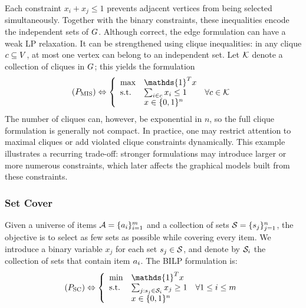 Each constraint $x_i+x_j\leq 1$ prevents adjacent vertices from being selected simultaneously. Together with the binary constraints, these inequalities encode the independent sets of $G$. Although correct, the edge formulation can have a weak LP relaxation. It can be strengthened using clique inequalities: in any clique $c\subseteq V$, at most one vertex can belong to an independent set. Let $\mathcal{K}$ denote a collection of cliques in $G$; this yields the formulation
\begin{align}
    \label{equ:mis_formulation_cliques}
    (P_\mathrm{MIS}) \Leftrightarrow \left\{
    \begin{array}{lll}
        \max        & \mathds{1}^T x   & \\
        \text{s.t.} & \sum_{i\in c} x_i \leq 1 & \forall c \in \CLIQUESET \\
                    & x \in \{0,1\}^n
    \end{array}
    \right.
\end{align}
The number of cliques can, however, be exponential in $n$, so the full clique formulation is generally not compact. In practice, one may restrict attention to maximal cliques or add violated clique constraints dynamically. This example illustrates a recurring trade-off: stronger formulations may introduce larger or more numerous constraints, which later affects the graphical models built from these constraints.

\subsubsection{Set Cover} 
Given a universe of items $\mathcal{A}=\{a_i\}_{i=1}^m$ and a collection of sets $\mathcal{S}=\{s_j\}_{j=1}^n$, the objective is to select as few sets as possible while covering every item. We introduce a binary variable $x_j$ for each set $s_j \in \mathcal{S}$, and denote by $\mathcal{S}_i$ the collection of sets that contain item $a_i$. The BILP formulation is:
\begin{align}
    \label{equ:sc_formulation}
    (P_\mathrm{SC}) \Leftrightarrow \left\{
    \begin{array}{lll}
        \min        & \mathds{1}^T x   & \\
        \text{s.t.} & \sum_{j:\SCSET_j \in \SCSETI} x_j \geq 1 & \forall 1 \leq i \leq m \\
                    & x \in \{0,1\}^n
    \end{array}
    \right.
\end{align}


